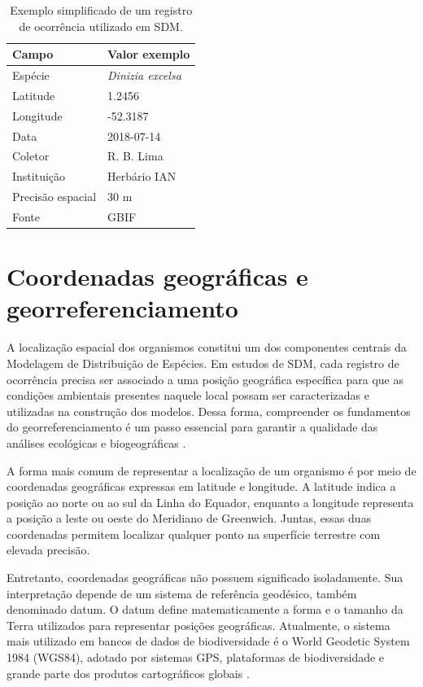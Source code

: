 \begin{table}[H]
	\centering
	\caption{Exemplo simplificado de um registro de ocorrência utilizado em SDM.}
	\label{tab:registro_ocorrencia}
	\begin{tabular}{ll}
		\toprule
		\textbf{Campo} & \textbf{Valor exemplo} \\
		\midrule
		Espécie & \textit{Dinizia excelsa} \\
		Latitude & 1.2456 \\
		Longitude & -52.3187 \\
		Data & 2018-07-14 \\
		Coletor & R. B. Lima \\
		Instituição & Herbário IAN \\
		Precisão espacial & 30 m \\
		Fonte & GBIF \\
		\bottomrule
	\end{tabular}
\end{table}

\section{Coordenadas geográficas e georreferenciamento}

A localização espacial dos organismos constitui um dos componentes centrais da Modelagem de Distribuição de Espécies. Em estudos de SDM, cada registro de ocorrência precisa ser associado a uma posição geográfica específica para que as condições ambientais presentes naquele local possam ser caracterizadas e utilizadas na construção dos modelos. Dessa forma, compreender os fundamentos do georreferenciamento é um passo essencial para garantir a qualidade das análises ecológicas e biogeográficas \parencite{franklin2010mapping}.

A forma mais comum de representar a localização de um organismo é por meio de coordenadas geográficas expressas em latitude e longitude. A latitude indica a posição ao norte ou ao sul da Linha do Equador, enquanto a longitude representa a posição a leste ou oeste do Meridiano de Greenwich. Juntas, essas duas coordenadas permitem localizar qualquer ponto na superfície terrestre com elevada precisão.

Entretanto, coordenadas geográficas não possuem significado isoladamente. Sua interpretação depende de um sistema de referência geodésico, também denominado datum. O datum define matematicamente a forma e o tamanho da Terra utilizados para representar posições geográficas. Atualmente, o sistema mais utilizado em bancos de dados de biodiversidade é o World Geodetic System 1984 (WGS84), adotado por sistemas GPS, plataformas de biodiversidade e grande parte dos produtos cartográficos globais \parencite{hijmans2021species}.

